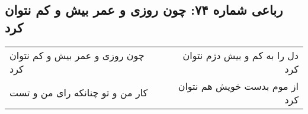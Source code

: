 \begin{center}
\section*{رباعی شماره ۷۴: چون روزی و عمر بیش و کم نتوان کرد}
\label{sec:sh074}
\begin{longtable}{l p{0.5cm} r}
چون روزی و عمر بیش و کم نتوان کرد
&&
دل را به کم و بیش دژم نتوان کرد
\\
کار من و تو چنانکه رای من و تست
&&
از موم بدست خویش هم نتوان کرد
\\
\end{longtable}
\end{center}
